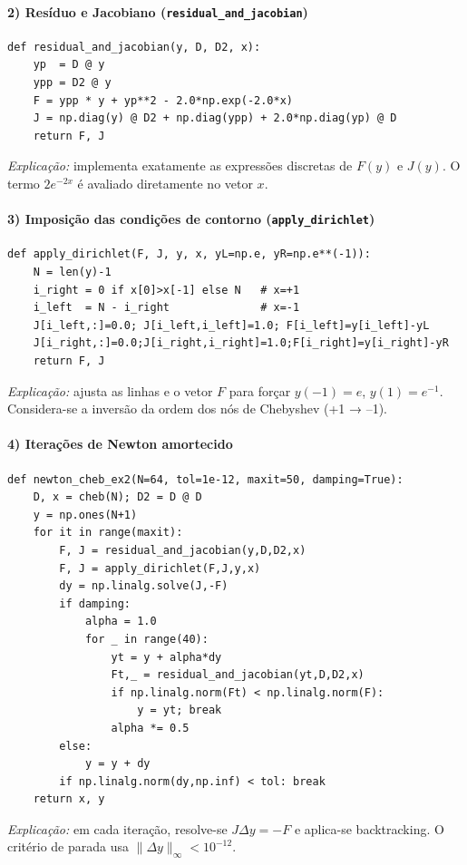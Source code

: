\documentclass[12pt,a4paper]{article}
\begin{document}
\paragraph{2) Resíduo e Jacobiano (\texttt{residual\_and\_jacobian})}
\begin{verbatim}
def residual_and_jacobian(y, D, D2, x):
    yp  = D @ y
    ypp = D2 @ y
    F = ypp * y + yp**2 - 2.0*np.exp(-2.0*x)
    J = np.diag(y) @ D2 + np.diag(ypp) + 2.0*np.diag(yp) @ D
    return F, J
\end{verbatim}
\textit{Explicação:} implementa exatamente as expressões discretas de \(F(y)\) e \(J(y)\).  
O termo \(2e^{-2x}\) é avaliado diretamente no vetor \(x\).

\paragraph{3) Imposição das condições de contorno (\texttt{apply\_dirichlet})}
\begin{verbatim}
def apply_dirichlet(F, J, y, x, yL=np.e, yR=np.e**(-1)):
    N = len(y)-1
    i_right = 0 if x[0]>x[-1] else N   # x=+1
    i_left  = N - i_right              # x=-1
    J[i_left,:]=0.0; J[i_left,i_left]=1.0; F[i_left]=y[i_left]-yL
    J[i_right,:]=0.0;J[i_right,i_right]=1.0;F[i_right]=y[i_right]-yR
    return F, J
\end{verbatim}
\textit{Explicação:} ajusta as linhas e o vetor \(F\) para forçar \(y(-1)=e\), \(y(1)=e^{-1}\).  
Considera-se a inversão da ordem dos nós de Chebyshev (+1 → –1).

\paragraph{4) Iterações de Newton amortecido}
\begin{verbatim}
def newton_cheb_ex2(N=64, tol=1e-12, maxit=50, damping=True):
    D, x = cheb(N); D2 = D @ D
    y = np.ones(N+1)
    for it in range(maxit):
        F, J = residual_and_jacobian(y,D,D2,x)
        F, J = apply_dirichlet(F,J,y,x)
        dy = np.linalg.solve(J,-F)
        if damping:
            alpha = 1.0
            for _ in range(40):
                yt = y + alpha*dy
                Ft,_ = residual_and_jacobian(yt,D,D2,x)
                if np.linalg.norm(Ft) < np.linalg.norm(F): 
                    y = yt; break
                alpha *= 0.5
        else:
            y = y + dy
        if np.linalg.norm(dy,np.inf) < tol: break
    return x, y
\end{verbatim}
\textit{Explicação:} em cada iteração, resolve-se \(J\Delta y=-F\) e aplica-se backtracking.  
O critério de parada usa \(\|\Delta y\|_\infty<10^{-12}\).
\end{document}

